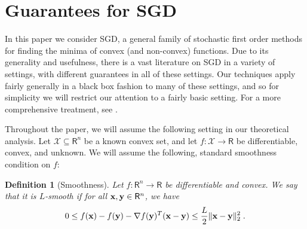\documentclass{article}
\newcommand{\R}{\mathsf{R}}
\def\x{{\bf x}}
\def\y{{\bf y}}
\newtheorem{definition}{Definition}
\begin{document}
\iffalse



%   
%    

\section{Guarantees for SGD}
In this paper we consider SGD, a general family of stochastic first order methods for finding the minima of convex (and non-convex) functions.
Due to its generality and usefulness, there is a vast literature on SGD in a variety of settings, with different guarantees in all of these settings.
Our techniques apply fairly generally in a black box fashion to many of these settings, and so for simplicity we will restrict our attention to a fairly basic setting.
For a more comprehensive treatment, see \cite{Bubeck15}.

Throughout the paper, we will assume the following setting in our theoretical analysis.
Let $\mathcal{X} \subseteq \R^n$ be a known convex set, and let $f: \mathcal{X} \to \R$ be differentiable, convex, and unknown.
We will assume the following, standard smoothness condition on $f$:
\begin{definition}[Smoothness]
Let $f: \R^n \to \R$ be differentiable and convex.
We say that it is $L$-smooth if for all $\x, \y \in \R^n$, we have
\[0 \leq f(\x) - f(\y) - \nabla f(\y)^T (\x - \y) \leq \frac{L}{2} \| \x - \y \|_2^2 \; .\]
\end{definition}
\end{document}
